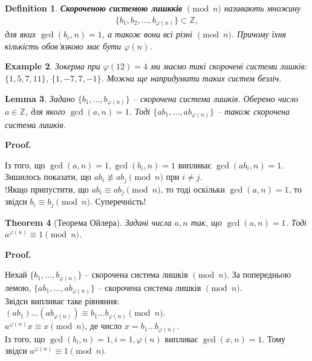 \documentclass[a4paper, 14pt]{extarticle}
\makeatletter
\theoremstyle{theoremdd}
\newtheorem{theorem}{Theorem}[subsection]
\theoremstyle{theoremdd}
\newtheorem{definition}[theorem]{Definition}
\theoremstyle{theoremdd}
\theoremstyle{theoremdd}
\newtheorem{example}[theorem]{Example}
\theoremstyle{theoremdd}
\theoremstyle{theoremdd}
\theoremstyle{theoremdd}
\newtheorem{lemma}[theorem]{Lemma}
\theoremstyle{theoremdd}
\def\qed{$\blacksquare$}
\renewenvironment{proof}[1][Proof.\\]{\par
\pushQED{\hfill \qed}%
\normalfont \topsep6\p@\@plus6\p@\relax
\trivlist
\item\relax
{\bfseries
#1\@addpunct{.}}\hspace\labelsep\ignorespaces
}{%
\popQED\endtrivlist\@endpefalse
}
\makeatother
\begin{document}
\begin{definition}
\textbf{Скороченою системою лишкків} $\!\pmod n$ називають множину 
\begin{align*}
\{b_1,b_2,\dots,b_{\varphi(n)}\} \subset \mathbb{Z},
\end{align*}
для яких $\gcd(b_r,n) = 1$, а також \iffalse $\forall r \neq s: b_r \not\equiv b_s \pmod n$.\fi вони всі різні $\! \pmod n$. Причому їхня кількість обов'язково має бути $\varphi(n)$.
\end{definition}

\begin{example}
Зокерма при $\varphi(12) = 4$ ми маємо такі скорочені системи лишків: $\{1,5,7,11\}$, \quad $\{1,-7,7,-1\}$. Можна ще напридумати таких систем безліч.
\end{example}

\begin{lemma}
Задано $\{b_1,\dots,b_{\varphi(n)}\}$ -- скорочена система лишків. Оберемо число $a \in \mathbb{Z}$, для якого $\gcd(a,n) = 1$. Тоді $\{ab_1,\dots,ab_{\varphi(n)}\}$ -- також скорочена система лишків.
\end{lemma}

\begin{proof}
Із того, що $\gcd(a,n) = 1, \gcd(b_i,n) = 1$ випливає $\gcd(ab_i,n) = 1$.\\
Зишилось показати, що $ab_i \not\equiv ab_j \pmod n$ при $i \neq j$.\\
!Якщо припустити, що $ab_i \equiv ab_j \pmod n$, то тоді оскільки $\gcd(a,n) = 1$, то звідси $b_i \equiv b_j \pmod n$. Суперечність!
\end{proof}

\begin{theorem}[Теорема Ойлера]
\label{Euler mod theorem}
Задані числа $a,n$ так, що $\gcd(a,n) = 1$. Тоді $a^{\varphi(n)} \equiv 1 \pmod n$.
\end{theorem}

\begin{proof}
Нехай $\{b_1,\dots,b_{\varphi(n)}\}$ -- скорочена система лишків $\!\! \pmod n$. За попередньою лемою, $\{ab_1,\dots,ab_{\varphi(n)}\}$ -- скорочена система лишків $\!\! \pmod n$.\\
Звідси випливає таке рівняння:\\
$(ab_1) \dots (ab_{\varphi(n)}) \equiv b_1 \dots b_{\varphi(n)} \pmod n$.\\
$a^{\varphi(n)}x \equiv x \pmod n$, де число $x = b_1\dots b_{\varphi(n)}$.\\ Із того, що $\gcd(b_i, n) = 1, i = \overline{1,\varphi(n)}$ випливає $\gcd(x, n) = 1$. Тому звідси $a^{\varphi(n)} \equiv 1 \pmod n$.
\end{proof}
\end{document}
